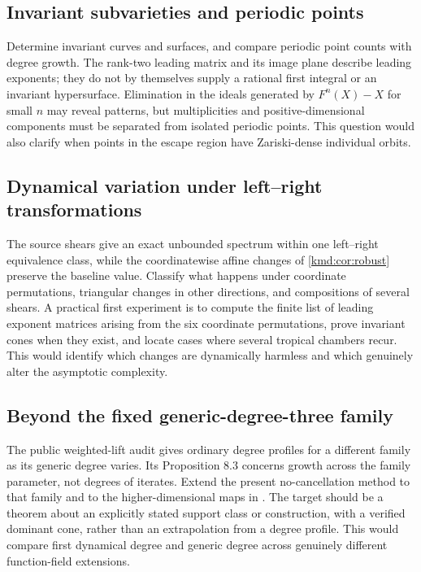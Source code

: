 \documentclass[11pt,a4paper]{article}
\numberwithin{equation}{section}
\theoremstyle{definition}
\theoremstyle{remark}
\begin{document}
\subsection{Invariant subvarieties and periodic points}
Determine invariant curves and surfaces, and compare periodic
point counts with degree growth. The rank-two leading matrix and
its image plane describe leading exponents; they do not by
themselves supply a rational first integral or an invariant
hypersurface. Elimination in the ideals generated by $F^n(X)-X$
for small $n$ may reveal patterns, but multiplicities and
positive-dimensional components must be separated from isolated
periodic points. This question would also clarify when points in
the escape region have Zariski-dense individual orbits.

\subsection{Dynamical variation under left--right transformations}
The source shears give an exact unbounded spectrum within one
left--right equivalence class, while the coordinatewise affine
changes of \cref{kmd:cor:robust} preserve the baseline value. Classify
what happens under coordinate permutations, triangular changes
in other directions, and compositions of several shears. A
practical first experiment is to compute the finite list of
leading exponent matrices arising from the six coordinate
permutations, prove invariant cones when they exist, and locate
cases where several tropical chambers recur. This would identify
which changes are dynamically harmless and which genuinely
alter the asymptotic complexity.

\subsection{Beyond the fixed generic-degree-three family}
The public weighted-lift audit \cite{audit} gives ordinary degree
profiles for a different family as its generic degree varies.
Its Proposition 8.3 concerns growth across the family parameter,
not degrees of iterates. Extend the present no-cancellation method
to that family and to the higher-dimensional maps in \cite{gao}.
The target should be a theorem about an explicitly stated support
class or construction, with a verified dominant cone, rather than
an extrapolation from a degree profile. This would compare first
dynamical degree and generic degree across genuinely different
function-field extensions.
\end{document}
